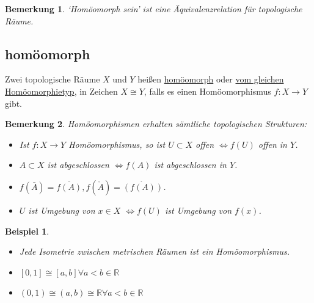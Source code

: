 \documentclass[a4paper,11pt,notitlepage]{report}
\newtheorem{remark}{Bemerkung}[chapter]
\newtheorem{example}{Beispiel}[chapter]
\newcommand{\R}{{\ensuremath{\mathbb{R}}}}
\newenvironment{Kasten}[1]
{
\hspace{0.05\linewidth}
\begin{center}
\begin{minipage}{0.9\linewidth}
\setlength{\fboxsep}{10pt}
\definecolor{shadecolor}{gray}{1}
\definecolor{framecolor}{gray}{0}
\def\FrameCommand{\fcolorbox{framecolor}{shadecolor}}
\MakeFramed {\FrameRestore}
\subsection{#1}
\begin{itshape}
}
{
\end{itshape}
\endMakeFramed
\end{minipage}
\end{center}
}
\begin{document}
\begin{remark}
	`Homöomorph sein' ist eine Äquivalenzrelation für topologische Räume.
\end{remark}

\begin{Kasten}{homöomorph}
	Zwei topologische Räume $X$ und $Y$ heißen \underline{homöomorph} oder \underline{vom gleichen Homöomorphietyp}, in Zeichen $X \cong Y$, falls es einen Homöomorphismus $f \colon X \rightarrow Y$ gibt.
\end{Kasten}

\begin{remark}
	Homöomorphismen erhalten sämtliche topologischen Strukturen:
	\begin{itemize}
		\item Ist $f \colon X \rightarrow Y$ Homöomorphismus, so ist $U \subset X$ offen $\Leftrightarrow f(U)$ offen in $Y$.
		\item $A \subset X$ ist abgeschlossen $\Leftrightarrow f(A)$ ist abgeschlossen in $Y$.
		\item $f(\bar{A}) = \overline{f(A)}, f(\mathring A) = \mathring{\left(f(A)\right)}$.
		\item $U$ ist Umgebung von $x \in X$ $\Leftrightarrow f(U)$ ist Umgebung von $f(x)$.
	\end{itemize}
\end{remark}

\begin{example}
	\begin{itemize}
		\item Jede Isometrie zwischen metrischen Räumen ist ein Homöomorphismus.
		\item $[0,1] \cong [a,b] \forall a < b \in \R$
		\item $(0,1) \cong (a,b) \cong \R \forall a < b \in \R$
	\end{itemize}
\end{example}
\end{document}
